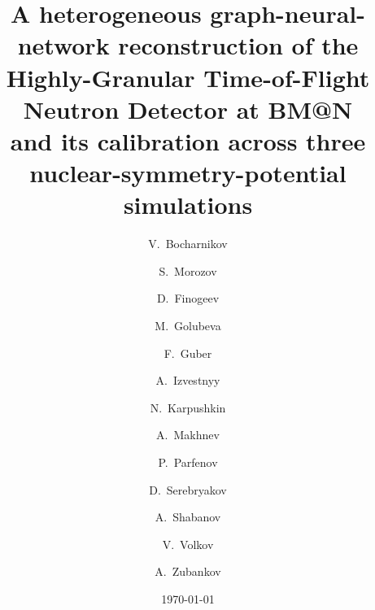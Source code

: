\documentclass[aps,prc,twocolumn,superscriptaddress,showpacs,%
               nofootinbib,floatfix,longbibliography]{revtex4-2}
\makeatletter
\newcommand{\BMN}{BM@N}
\makeatother
\begin{document}
\title{A heterogeneous graph-neural-network reconstruction of the
       Highly-Granular Time-of-Flight Neutron Detector at \BMN{}\\
       and its calibration across three
       nuclear-symmetry-potential simulations}

\author{V.~Bocharnikov}
\author{S.~Morozov}
\author{D.~Finogeev}
\author{M.~Golubeva}
\author{F.~Guber}
\author{A.~Izvestnyy}
\author{N.~Karpushkin}
\author{A.~Makhnev}
\author{P.~Parfenov}
\author{D.~Serebryakov}
\author{A.~Shabanov}
\author{V.~Volkov}
\author{A.~Zubankov}

\date{\today}
\end{document}

